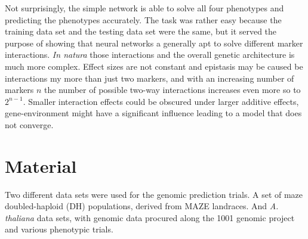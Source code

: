 Not surprisingly, the simple network is able to solve all four phenotypes and predicting the phenotypes
accurately. The task was rather easy because the training data set and the testing data set were the same, but
it served the purpose of showing that neural networks a generally apt to solve different marker
interactions. \textit{In natura} those interactions and the overall genetic architecture is much more
complex. Effect sizes are not constant and epistasis may be caused be interactions my more than just two
markers, and with an increasing number of markers $n$ the number of possible two-way interactions increases
even more so to $2^{n-1}$. Smaller interaction effects could be obscured under larger additive effects,
gene-environment might have a significant influence leading to a model that does not converge.


\section{Material}
Two different data sets were used for the genomic prediction trials.
A set of maze doubled-haploid (DH) populations, derived from MAZE landraces. And \textit{A. thaliana} data sets, with genomic data procured along the 1001 genomic project \cite{1001genome} and various phenotypic trials.


